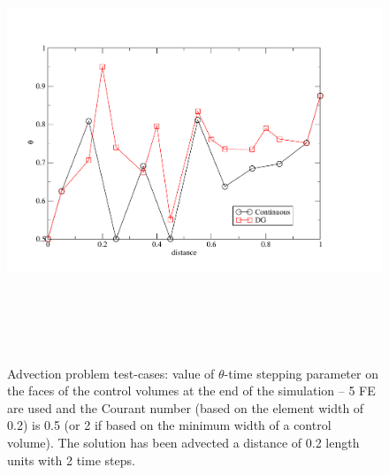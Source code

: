 \begin{figure}[h]
\vbox{\hbox{\hspace{-1.3cm}
\includegraphics[width=17.5cm,height=12.5cm]{diagrams/theta-bdt}}
\vspace{0.cm}}
\caption{Advection problem test-cases: value of $\theta$-time stepping
  parameter on the faces of the control volumes at the end of the
  simulation -- 5 FE are used and the Courant number (based on the
  element width of 0.2) is 0.5 (or 2 if based on the minimum width of
  a control volume). The solution has been advected a distance of 0.2
  length units with 2 time steps.}
\label{theta-bdt}
\end{figure}


